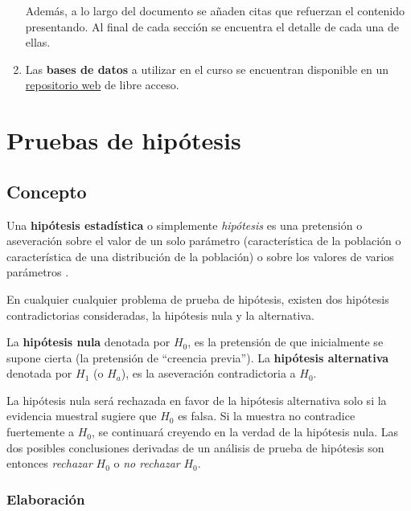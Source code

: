 \documentclass[
]{book}
\theoremstyle{definition}
\theoremstyle{definition}
\theoremstyle{definition}
\theoremstyle{definition}
\theoremstyle{remark}
\begin{document}
\begin{enumerate}
  Además, a lo largo del documento se añaden citas que refuerzan el contenido presentando. Al final de cada sección se encuentra el detalle de cada una de ellas.
\item
  Las \textbf{bases de datos} a utilizar en el curso se encuentran disponible en un \href{https://github.com/Dfranzani/Bases-de-datos-para-cursos/tree/main/2023-1/Estad\%C3\%ADstica\%201}{repositorio web} de libre acceso.
\end{enumerate}

\hypertarget{pruebas-de-hipuxf3tesis}{%
\chapter{Pruebas de hipótesis}\label{pruebas-de-hipuxf3tesis}}

\hypertarget{concepto}{%
\section{Concepto}\label{concepto}}

Una \textbf{hipótesis estadística} o simplemente \emph{hipótesis} es una pretensión o aseveración sobre el valor de un solo parámetro (característica de la población o característica de una distribución de la población) o sobre los valores de varios parámetros \citep[página 285]{Devore} \citep[página 340]{anderson}.

En cualquier cualquier problema de prueba de hipótesis, existen dos hipótesis contradictorias consideradas, la hipótesis nula y la alternativa.

La \textbf{hipótesis nula} denotada por \(H_0\), es la pretensión de que inicialmente se supone cierta (la pretensión de ``creencia previa''). La \textbf{hipótesis alternativa} denotada por \(H_1\) (o \(H_a\)), es la aseveración contradictoria a \(H_0\).

La hipótesis nula será rechazada en favor de la hipótesis alternativa solo si la evidencia muestral sugiere que \(H_0\) es falsa. Si la muestra no contradice fuertemente a \(H_0\), se continuará creyendo en la verdad de la hipótesis nula. Las dos posibles conclusiones derivadas de un análisis de prueba de hipótesis son entonces \emph{rechazar} \(H_0\) o \emph{no rechazar} \(H_0\).

\hypertarget{elaboraciuxf3n}{%
\subsection{Elaboración}\label{elaboraciuxf3n}}
\end{document}
